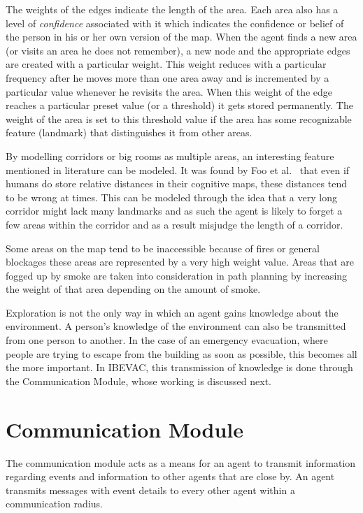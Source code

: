 The weights of the edges indicate the length of the area. Each area also has a level of \emph{confidence} associated with it which indicates the confidence or belief of the person in his or her own version of the map. When the agent finds a new area (or visits an area he does not remember), a new node and the appropriate edges are created with a particular weight. This weight reduces with a particular frequency after he moves more than one area away and is incremented by a particular value whenever he revisits the area. When this weight of the edge reaches a particular preset value (or a threshold) it gets stored permanently. The weight of the area is set to this threshold value if the area has some recognizable feature (landmark) that distinguishes it from other areas.

By modelling corridors or big rooms as multiple areas, an interesting feature mentioned in literature can be modeled. It was found by Foo et al.~\cite{Foo:2005kw} that even if humans do store relative distances in their cognitive maps, these distances tend to be wrong at times. This can be modeled through the idea that a very long corridor might lack many landmarks and as such the agent is likely to forget a few areas within the corridor and as a result misjudge the length of a corridor.

Some areas on the map tend to be inaccessible because of fires or general blockages these areas are represented by a very high weight value. Areas that are fogged up by smoke are taken into consideration in path planning by increasing the weight of that area depending on the amount of smoke.

Exploration is not the only way in which an agent gains knowledge about the environment. A person's knowledge of the environment can also be transmitted from one person to another. In the case of an emergency evacuation, where people are trying to escape from the building as soon as possible, this becomes all the more important. In IBEVAC, this transmission of knowledge is done through the Communication Module, whose working is discussed next.

\section{Communication Module}
\label{CFW:CommunicationModule}
The communication module acts as a means for an agent to transmit information regarding events and information to other agents that are close by. An agent transmits messages with event details to every other agent within a communication radius.

